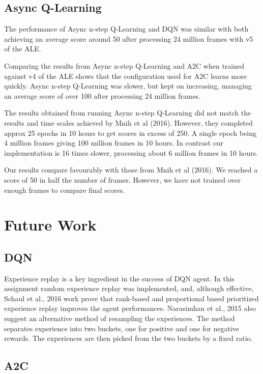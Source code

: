 \documentclass{article}
\begin{document}
\subsection{Async Q-Learning}

The performance of Async n-step Q-Learning and DQN was similar with both achieving an average score around 50 after processing 24 million frames with v5 of the ALE.

Comparing the results from Async n-step Q-Learning and A2C when trained against v4 of the ALE shows that the configuration used for A2C  learns more quickly. Async n-step Q-Learning was slower, but kept on increasing, managing an average score of over 100 after processing 24 million frames.

The results obtained from running Async n-step Q-Learning did not match the results and time scales achieved by Mnih et al (2016). However, they completed approx 25 epochs in 10 hours to get scores in excess of 250. A single epoch being 4 million frames giving 100 million frames in 10 hours. In contrast our implementation is 16 times slower, processing about 6 million frames in 10 hours.

Our results compare favourably with those from Mnih et al (2016). We reached a score of 50 in half the number of frames. However, we have not trained over enough frames to compare final scores.

\section{Future Work}

\subsection{DQN}
Experience replay is a key ingredient in the success of DQN agent. In this assignment random experience replay was implemented, and, although effective, Schaul et al., 2016 work prove that rank-based and proportional based prioritized experience replay improves the agent performances. Narasimhan et al., 2015 also suggest an alternative method of resampling the experiences. The method separates experience into two buckets, one for positive and one for negative rewards. The experiences are then picked from the two buckets by a fixed ratio.

\subsection{A2C}
\end{document}
